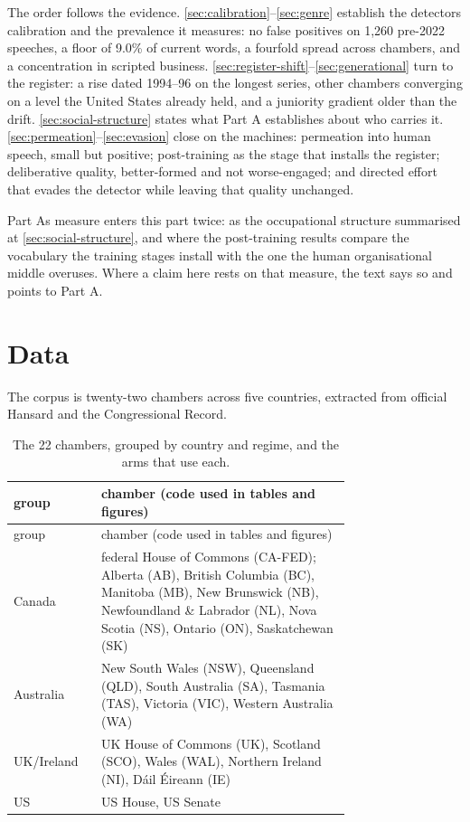 The order follows the evidence. \cref{sec:calibration}--\cref{sec:genre} establish the detector\textquotesingle s
calibration and the prevalence it measures: no false positives on 1,260
pre-2022 speeches, a floor of 9.0\% of current words, a fourfold spread across
chambers, and a concentration in scripted business. \cref{sec:register-shift}--\cref{sec:generational} turn to the
register: a rise dated 1994--96 on the longest series, other chambers
converging on a level the United States already held, and a juniority
gradient older than the drift. \cref{sec:social-structure} states what Part A establishes about who
carries it. \cref{sec:permeation}--\cref{sec:evasion} close on the machines: permeation into human speech,
small but positive; post-training as the stage that installs the register;
deliberative quality, better-formed and not worse-engaged; and directed effort
that evades the detector while leaving that quality unchanged.

Part A\textquotesingle s measure enters this part twice: as the occupational structure
summarised at \cref{sec:social-structure}, and where the post-training results compare the
vocabulary the training stages install with the one the human organisational
middle overuses. Where a claim here rests on that measure, the text says so
and points to Part A.

\section{Data}\label{sec:data}

The corpus is twenty-two chambers across five countries, extracted from
official Hansard and the Congressional Record.

\begingroup\small
\begin{longtable}[]{@{}lp{0.74\linewidth}@{}}
\caption{The 22 chambers, grouped by country and regime, and the arms that use each.}\label{tab:chambers}\\
\toprule\noalign{}
group & chamber (code used in tables and figures) \\
\midrule\noalign{}
\endfirsthead
\toprule\noalign{}
group & chamber (code used in tables and figures) \\
\midrule\noalign{}
\endhead
\bottomrule\noalign{}
\endlastfoot
Canada & federal House of Commons (CA-FED); Alberta (AB), British Columbia (BC), Manitoba (MB), New Brunswick (NB), Newfoundland \& Labrador (NL), Nova Scotia (NS), Ontario (ON), Saskatchewan (SK) \\
Australia & New South Wales (NSW), Queensland (QLD), South Australia (SA), Tasmania (TAS), Victoria (VIC), Western Australia (WA) \\
UK/Ireland & UK House of Commons (UK), Scotland (SCO), Wales (WAL), Northern Ireland (NI), Dáil Éireann (IE) \\
US & US House, US Senate \\
\end{longtable}
\endgroup


